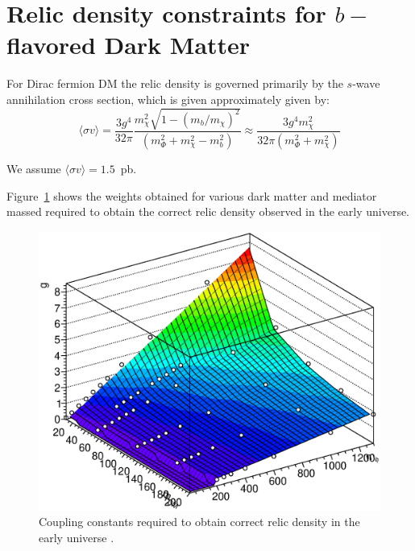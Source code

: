 \section{\texorpdfstring{Relic density constraints for $b-$flavored Dark Matter}{Relic density constraints for b-flavored Dark Matter}}
\label{app:Relic_Density_bFDM}

For Dirac fermion DM the relic density is governed primarily by the $s$-wave annihilation cross section, which is given approximately given by:
\begin{equation}
\langle \sigma v \rangle = \frac{3g^4}{32\pi} \frac{m^2_\chi \sqrt{1-(m_b/m_\chi)^2}}{\left( m^2_\Phi+m^2_\chi-m^2_b \right)} \approx \frac{3g^4 m^2_\chi}{32\pi (m^2_\Phi+m^2_\chi)}
\end{equation}

We assume $ \langle \sigma v \rangle=1.5$~pb. 


Figure~\ref{fig:relic_weights} shows the weights obtained for various dark matter and mediator massed required to obtain the correct relic density observed in the early universe.

\begin{figure}[h!]
	\centering 
	\includegraphics[scale=0.5]{figures/bFDM/relic_weights.eps}
	\caption{Coupling constants required to obtain correct relic density in the early universe . \label{fig:relic_weights}}
	\end{figure}	
	
